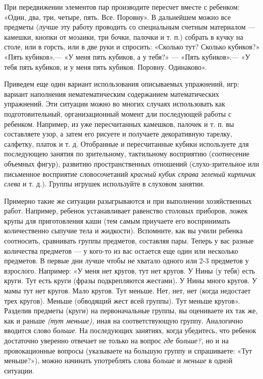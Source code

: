 \documentclass[a5paper]{book}
\renewcommand{\emph}[1]{\textit{#1}}
\begin{document}
При передвижении элементов пар производите пересчет вместе с ребенком:
«Один, два, три, четыре, пять. Все. Поровну». В дальнейшем можно все
предметы (лучше эту работу проводить со специальным счетным материалом
--- камешки, кнопки от мозаики, три бочки, палочки и т. п.) собрать в
кучку на столе, или в горсть, или в две руки и спросить: «Сколько тут?
Сколько кубиков?» «Пять кубиков».--- «У меня пять кубиков, а у тебя?»
--- «Пять кубиков».--- «У тебя пять кубиков, и у меня пять кубиков.
Поровну. Одинаково».

Приведем еще один вариант использования описываемых упражнений, игр:
вариант наполнения нематематическим содержанием математических
упражнений. Эти ситуации можно во многих случаях использовать как
подготовительный, организационный момент дли последующей работы с
ребенком. Например, из уже пересчитанных камешков, палочек и т. п. вы
составляете узор, а затем его рисуете и получаете декоративную тарелку,
салфетку, платок и т. д. Отобранные и пересчитанные кубики используете
для последующею занятия по зрительному, тактильному восприятию
(соотнесение объемных фигур), развитию пространственных отношений
(слухо-зрительное или письменное восприятие словосочетаний \emph{красный
кубик справа зеленый кирпичик слева} и т. д.). Группы игрушек
используйте в слуховом занятии.

Примерно такие же ситуации разыгрываются и при выполнении хозяйственных
работ. Например, ребенок устанавливает равенство столовых приборов,
ложек крупы для приготовления каши (тем самым приучаете его воспринимать
количественно сыпучие тела и жидкости). Вспомните, как вы учили ребенка
соотносить, сравнивать группы предметов, составляя пары. Теперь у вас
разные количества предметов --- у кого-то из вас остается еще один или
несколько предметов. В первые дни лучше чтобы не хватало одного или 2-3
предметов у взрослого. Например: «У меня нет кругов, тут нет кругов. У
Нины (у тебя) есть круги. Тут есть круги (фразы подкрепляются жестами).
У Нины много кругов. У мамы тут нет кругов. Мало кругов. Тут меньше.
Нет, нет, нет (когда недостает трех кругов). Меньше (обводящий жест всей
группы). Тут меньше кругов». Разделив предметы (круги) на первоначальные
группы, вы оцениваете их так же, как и раньше \emph{(тут меньше),} иная
на соответствующую группу. Аналогично вводится слово \emph{больше.} На
последующих занятиях, когда убедитесь, что ребенок достаточно уверенно
отвечает не только на вопрос \emph{где больше?,} но и на провокационные
вопросы (указываете на большую группу и спрашиваете: «Тут меньше?»),
можно начинать употреблять слова \emph{больше} и \emph{меньше} в одной
ситуации.
\end{document}
